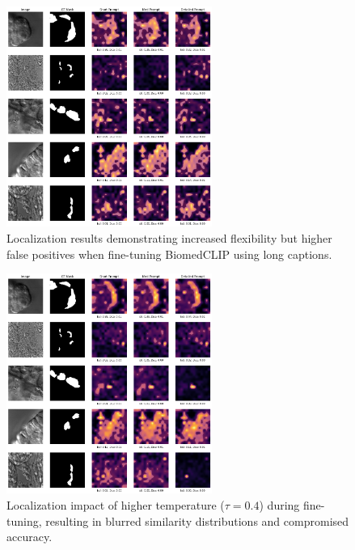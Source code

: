 \documentclass[./dissertation.tex]{subfiles}
\begin{document}
\begin{figure}
    \centering
    \includegraphics[width=0.6\textwidth]{figures/sam/train with long captions.png}
    \caption{Localization results demonstrating increased flexibility but higher false positives when fine-tuning BiomedCLIP using long captions.}
    \label{fig:train_long_captions}
\end{figure}

\begin{figure}
    \centering
    \includegraphics[width=0.6\textwidth]{figures/sam/fine-tuned with mask th 0.4.png}
    \caption{Localization impact of higher temperature (\(\tau = 0.4\)) during fine-tuning, resulting in blurred similarity distributions and compromised accuracy.}
    \label{fig:fine_tuned_with_mask_th_0_4}
\end{figure}
\end{document}
